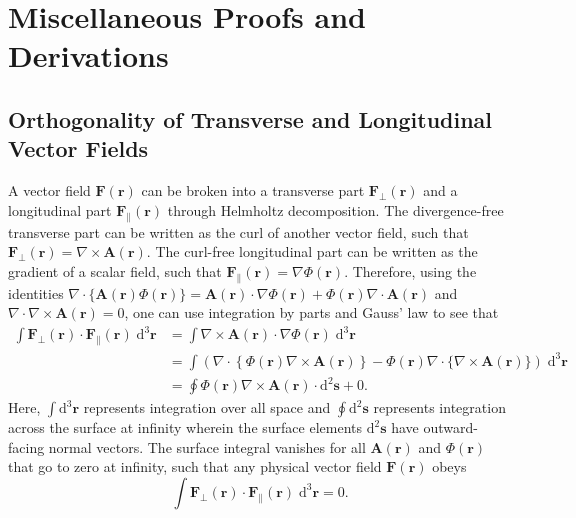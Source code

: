 \documentclass{article}
\numberwithin{equation}{section}
\begin{document}
\section{Miscellaneous Proofs and Derivations}

\subsection{Orthogonality of Transverse and Longitudinal Vector Fields}\label{sec:ortho}

A vector field $\mathbf{F}(\mathbf{r})$ can be broken into a transverse part $\mathbf{F}_\perp(\mathbf{r})$ and a longitudinal part $\mathbf{F}_\parallel(\mathbf{r})$ through Helmholtz decomposition. The divergence-free transverse part can be written as the curl of another vector field, such that $\mathbf{F}_\perp(\mathbf{r}) = \nabla\times\mathbf{A}(\mathbf{r})$. The curl-free longitudinal part can be written as the gradient of a scalar field, such that $\mathbf{F}_\parallel(\mathbf{r}) = \nabla\Phi(\mathbf{r})$. Therefore, using the identities $\nabla\cdot\{\mathbf{A}(\mathbf{r})\Phi(\mathbf{r})\} = \mathbf{A}(\mathbf{r})\cdot\nabla\Phi(\mathbf{r}) + \Phi(\mathbf{r})\nabla\cdot\mathbf{A}(\mathbf{r})$ and $\nabla\cdot\nabla\times\mathbf{A}(\mathbf{r}) = 0$, one can use integration by parts and Gauss' law to see that
\begin{equation}
\begin{split}
\int\mathbf{F}_\perp(\mathbf{r})\cdot\mathbf{F}_\parallel(\mathbf{r})\;\mathrm{d}^3\mathbf{r} &= \int\nabla\times\mathbf{A}(\mathbf{r})\cdot\nabla\Phi(\mathbf{r})\;\mathrm{d}^3\mathbf{r}\\
&=\int\left(\nabla\cdot\left\{\Phi(\mathbf{r})\nabla\times\mathbf{A}(\mathbf{r})\right\} - \Phi(\mathbf{r})\nabla\cdot\{\nabla\times\mathbf{A}(\mathbf{r})\}\right)\;\mathrm{d}^3\mathbf{r}\\
&= \oint\Phi(\mathbf{r})\nabla\times\mathbf{A}(\mathbf{r})\cdot\mathrm{d}^2\mathbf{s} + 0.
\end{split}
\end{equation}
Here, $\int\mathrm{d}^3\mathbf{r}$ represents integration over all space and $\oint\mathrm{d}^2\mathbf{s}$ represents integration across the surface at infinity wherein the surface elements $\mathrm{d}^2\mathbf{s}$ have outward-facing normal vectors. The surface integral vanishes for all $\mathbf{A}(\mathbf{r})$ and $\Phi(\mathbf{r})$ that go to zero at infinity, such that any physical vector field $\mathbf{F}(\mathbf{r})$ obeys
\begin{equation}
\int\mathbf{F}_\perp(\mathbf{r})\cdot\mathbf{F}_\parallel(\mathbf{r})\;\mathrm{d}^3\mathbf{r} = 0.
\end{equation}
\end{document}
